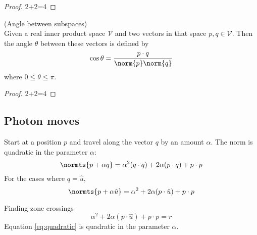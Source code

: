 \begin{proof}
2+2=4
\end{proof}
\begin{myTheorem}(Angle between subspaces)\\
Given a real inner product space $\mathcal{V}$ and two vectors in that space $p,q\in\mathcal{V}$. Then the angle $\theta$ between these vectors is defined by
\begin{equation}
  \cos \theta = \frac{p \cdot q}{\norm{p}\norm{q}}
\end{equation}
where $0\le \theta \le \pi$.
\end{myTheorem}
\begin{proof}
2+2=4
\end{proof}

\subsection{Photon moves}
Start at a position $p$ and travel along the vector $q$ by an amount $\alpha$. The norm is quadratic in the parameter $\alpha$:
\begin{equation}
  \normts{p + \alpha q} = \alpha^{2} (q\cdot q) + 2 \alpha (p\cdot q) + p\cdot p
\end{equation}
For the cases where $q = \hat{u}$, 
\begin{equation}
  \normts{p + \alpha \hat{u}} = \alpha^{2} + 2 \alpha (p\cdot \hat{u}) + p\cdot p
\end{equation}

Finding zone crossings
%
\begin{equation}
  \alpha^{2} + 2 \alpha (p\cdot \hat{u}) + p\cdot p = r
  \label{eq:quadratic}
\end{equation}
%
Equation \eqref{eq:quadratic} is quadratic in the parameter $\alpha$.

